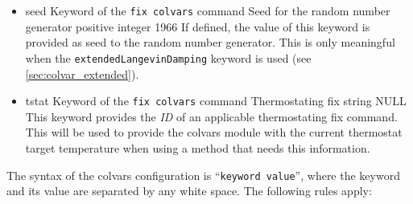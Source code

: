 {\begin{itemize}
\item %
  \keydef
    {seed}{%
    Keyword of the \texttt{fix colvars} command}{%
    Seed for the random number generator}{%
    positive integer}{%
    1966}{%
    If defined, the value of this keyword is provided as seed to the random number generator.
    This is only meaningful when the \texttt{extendedLangevinDamping} keyword is used (see \ref{sec:colvar_extended}).}

\item %
  \keydef
    {tstat}{%
    Keyword of the \texttt{fix colvars} command}{%
    Thermostating fix}{%
    string}{%
    NULL}{%
    This keyword provides the \emph{ID} of an applicable thermostating fix command. This will be used to provide the colvars module with the current thermostat target temperature when using a method that needs this information.}

\end{itemize}
}


\label{sec:colvars_config}

The syntax of the colvars configuration is ``\texttt{keyword value}'', where the keyword and its value are separated by any white space.
The following rules apply:

